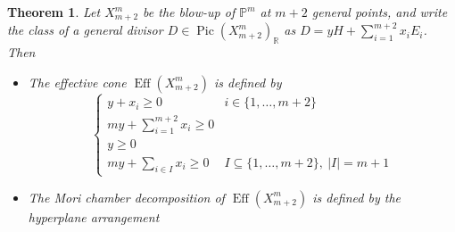 \documentclass[a4paper,10pt]{amsart}
\newtheorem{thm}{Theorem}[section]
\theoremstyle{definition}
\DeclareMathOperator{\Pic}{Pic}
\DeclareMathOperator{\Eff}{Eff}
\begin{document}
\begin{thm}\label{thmcd}
Let $X_{m+2}^m$ be the blow-up of $\mathbb{P}^m$ at $m+2$ general points, and write the class of a general divisor $D\in \Pic(X_{m+2}^m)_{\mathbb{R}}$ as $D = yH + \sum_{i=1}^{m+2}x_iE_i$. Then
\begin{itemize}
\item[-] The effective cone $\Eff(X_{m+2}^m)$ is defined by 
$$
\left\{
\begin{array}{ll}
 y+x_i\geq 0 & i\in\{1,\dots,m+2\}\\ 
 my+\sum_{i=1}^{m+2}x_i\geq 0 & \\
 y\geq 0 & \\
 my + \sum_{i\in I}x_i\geq 0 & I\subseteq\{1,\dots,m+2\},\: |I| = m+1  
 \end{array}  
\right.
$$
\item[-] The Mori chamber decomposition of $\Eff(X_{m+2}^m)$ is defined by the hyperplane arrangement


\end{itemize}
\end{thm}
\end{document}
